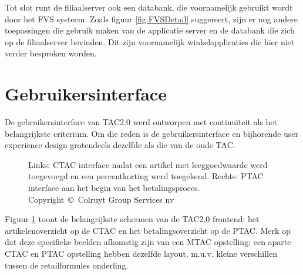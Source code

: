 Tot slot runt de filiaalserver ook een databank, die voornamelijk gebruikt wordt door het FVS systeem. Zoals figuur \ref{fig:FVSDetail} suggereert, zijn er nog andere toepassingen die gebruik maken van de applicatie server en de databank die zich op de filiaalserver bevinden. Dit zijn voornamelijk winkelapplicaties die hier niet verder besproken worden.

\section{Gebruikersinterface}

De gebruikersinterface van TAC2.0 werd ontworpen met continuïteit als het belangrijkste criterium. Om die reden is de gebruikersinterface en bijhorende user experience design grotendeels dezelfde als die van de oude TAC.

\begin{figure}%
    \centering
    \qquad
    \caption{Links: CTAC interface nadat een artikel met leeggoedwaarde werd toegevoegd en een percentkorting werd toegekend. Rechts: PTAC interface aan het begin van het betalingsproces. \scriptsize Copyright~\copyright~Colruyt Group Services nv}%
    \label{fig:ctac-ptac-ui}%
\end{figure}

Figuur \ref{fig:ctac-ptac-ui} toont de belangrijkste schermen van de TAC2.0 frontend: het artikelenoverzicht op de CTAC en het betalingsoverzicht op de PTAC. Merk op dat deze specifieke beelden afkomstig zijn van een MTAC opstelling; een aparte CTAC en PTAC opstelling hebben dezelfde layout, m.u.v. kleine verschillen tussen de retailformules onderling.

